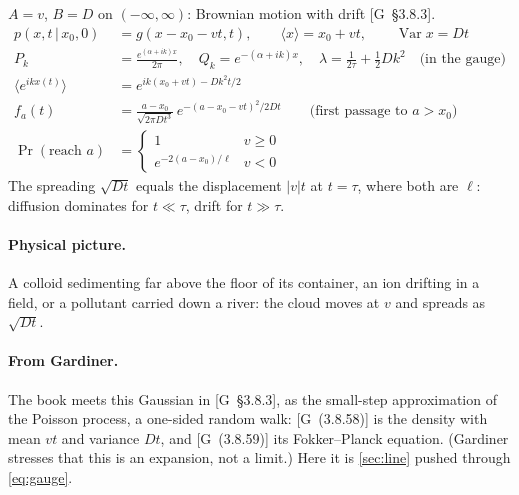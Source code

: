 \documentclass[11pt]{article}
\numberwithin{equation}{section}
\newcommand{\avg}[1]{\langle #1\rangle}
\newcommand{\given}{\,|\,}
\newcommand{\G}[1]{[G~(#1)]}
\newcommand{\Gs}[1]{[G~\S#1]}
\begin{document}
\begin{keyresults}
$A=v$, $B=D$ on $(-\infty,\infty)$: Brownian motion with drift \Gs{3.8.3}.
\begin{align}
  p(x,t\given x_0,0) &= g(x-x_0-vt,t),\qquad \avg x=x_0+vt,\qquad \operatorname{Var}x=Dt \\
  P_k &= \frac{e^{(\alpha+ik)x}}{2\pi},\quad Q_k=e^{-(\alpha+ik)x},\quad \lambda=\frac1{2\tau}+\tfrac12Dk^2\quad
  \text{(in the gauge)} \\
  \avg{e^{ikx(t)}} &= e^{ik(x_0+vt)-Dk^2t/2} \\
  f_a(t) &= \frac{a-x_0}{\sqrt{2\pi Dt^3}}\,e^{-(a-x_0-vt)^2/2Dt}\qquad\text{(first passage to }a>x_0) \\
  \Pr(\text{reach }a) &= \begin{cases}1&v\ge0\\e^{-2(a-x_0)/\ell}&v<0\end{cases}
\end{align}
The spreading $\sqrt{Dt}$ equals the displacement $|v|t$ at $t=\tau$, where both are $\ell$: diffusion
dominates for $t\ll\tau$, drift for $t\gg\tau$.
\end{keyresults}

\paragraph{Physical picture.} A colloid sedimenting far above the floor of its container, an ion drifting in a
field, or a pollutant carried down a river: the cloud moves at $v$ and spreads as $\sqrt{Dt}$.

\paragraph{From Gardiner.} The book meets this Gaussian in \Gs{3.8.3}, as the small-step approximation of the
Poisson process, a one-sided random walk: \G{3.8.58} is the density with mean $vt$ and variance $Dt$, and
\G{3.8.59} its Fokker--Planck equation. (Gardiner stresses that this is an expansion, not a limit.) Here it is \cref{sec:line} pushed through \cref{eq:gauge}.
\end{document}
